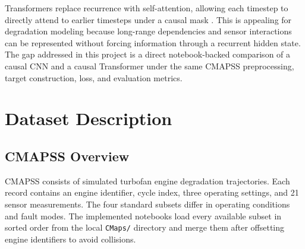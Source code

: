 \documentclass[11pt,a4paper]{article}
\begin{document}
Transformers replace recurrence with self-attention, allowing each timestep to directly attend to earlier timesteps under a causal mask \citep{vaswani2017attention}. This is appealing for degradation modeling because long-range dependencies and sensor interactions can be represented without forcing information through a recurrent hidden state. The gap addressed in this project is a direct notebook-backed comparison of a causal CNN and a causal Transformer under the same CMAPSS preprocessing, target construction, loss, and evaluation metrics.

\newpage

\section{Dataset Description}

\subsection{CMAPSS Overview}
CMAPSS consists of simulated turbofan engine degradation trajectories. Each record contains an engine identifier, cycle index, three operating settings, and 21 sensor measurements. The four standard subsets differ in operating conditions and fault modes. The implemented notebooks load every available subset in sorted order from the local \texttt{CMaps/} directory and merge them after offsetting engine identifiers to avoid collisions.

\begin{table}[htbp]
\centering
\caption{CMAPSS subset statistics computed from the local raw files. Length values are engine-level cycle counts.}
\label{tab:dataset_summary}
\end{table}
\end{document}
